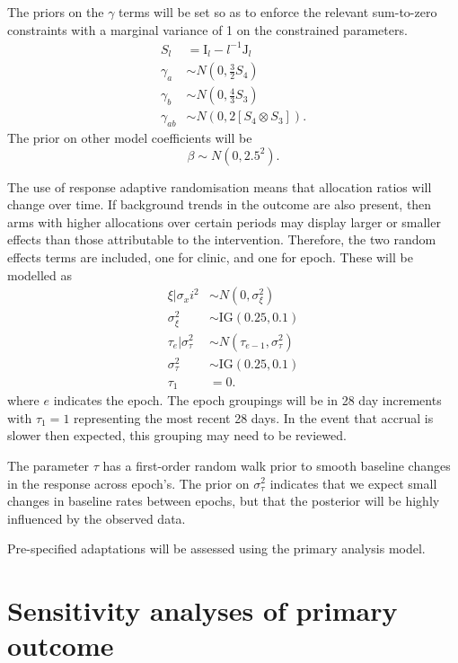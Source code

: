 \documentclass[
  bibliography=totoc]{scrreprt}
\begin{document}
The priors on the \(\gamma\) terms will be set so as to enforce the relevant sum-to-zero constraints with a marginal variance of 1 on the constrained parameters.
\[
\begin{aligned}
S_l &= \mathrm{I}_l - l^{-1}\mathrm{J}_l \\
\gamma_a &\sim N\left(0, \frac{3}{2}S_4\right) \\
\gamma_b &\sim N\left(0, \frac{4}{3}S_3\right) \\
\gamma_{ab} &\sim N\left(0, 2\left[S_4\otimes S_3\right]\right).
\end{aligned}
\]
The prior on other model coefficients will be
\[
\beta \sim N(0, 2.5^2).
\]

The use of response adaptive randomisation means that allocation ratios will change over time.
If background trends in the outcome are also present, then arms with higher allocations over certain periods may display larger or smaller effects than those attributable to the intervention.
Therefore, the two random effects terms are included, one for clinic, and one for epoch.
These will be modelled as
\[
\begin{aligned}
\xi|\sigma_xi^2 &\sim N(0, \sigma^2_\xi) \\
\sigma_\xi^2 &\sim \text{IG}(0.25, 0.1) \\
\tau_e|\sigma_\tau^2 &\sim N(\tau_{e-1}, \sigma_\tau^2) \\
\sigma_\tau^2 &\sim \text{IG}(0.25, 0.1) \\
\tau_1 &= 0.
\end{aligned}
\]
where \(e\) indicates the epoch.
The epoch groupings will be in 28 day increments with \(\tau_1=1\) representing the most recent 28 days.
In the event that accrual is slower then expected, this grouping may need to be reviewed.

The parameter \(\tau\) has a first-order random walk prior to smooth baseline changes in the response across epoch's.
The prior on \(\sigma_\tau^2\) indicates that we expect small changes in baseline rates between epochs, but that the posterior will be highly influenced by the observed data.

Pre-specified adaptations will be assessed using the primary analysis model.

\hypertarget{sensitivity-analyses-of-primary-outcome}{%
\section{Sensitivity analyses of primary outcome}\label{sensitivity-analyses-of-primary-outcome}}
\end{document}
